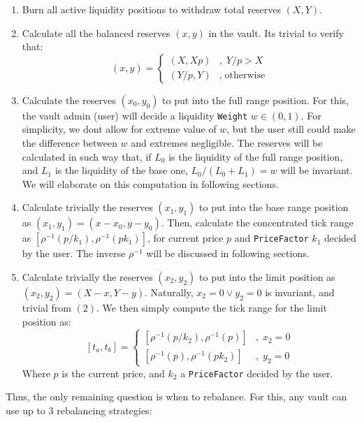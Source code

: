 \documentclass[11pt]{article}
\begin{document}
\begin{enumerate}
    \item Burn all active liquidity positions to withdraw total reserves $(X, Y)$.
    \item Calculate all the balanced reserves $(x, y)$ in the vault. Its trivial
        to verify that:
        $$
        (x, y) = \begin{cases}
            (X, Xp) &,\; Y/p > X\\
            (Y/p, Y) &,\; \text{otherwise}
        \end{cases}
        $$
    \item Calculate the reserves $(x_0, y_0)$ to put into the full range position.
        For this, the vault admin (user) will decide a liquidity
        \texttt{Weight} $w\in(0, 1)$. For simplicity, we dont allow for extreme
        value of $w$, but the user still could make the difference between $w$
        and extremes negligible. The reserves will be calculated in such way
        that, if $L_0$ is the liquidity of the full range position, and $L_1$
        is the liquidity of the base one, $L_0/(L_0 + L_1) = w$ will be
        invariant. We will elaborate on this computation in following sections.
    \item Calculate trivially the reserves $(x_1, y_1)$ to put into the base
        range position as $(x_1, y_1) = (x - x_0, y - y_0)$. Then, calculate
        the concentrated tick range as $[\rho^{-1}(p/k_1), \rho^{-1}(pk_1)]$, for
        current price $p$ and \texttt{PriceFactor} $k_1$ decided by the user.
        The inverse $\rho^{-1}$ will be discussed in following sections.
    \item Calculate trivially the reserves $(x_2, y_2)$ to put into the limit
        position as $(x_2, y_2) = (X - x, Y - y)$. Naturally, $x_2 = 0\lor y_2 = 0$
        is invariant, and trivial from $(2)$. We then simply compute the tick range
        for the limit position as:
        $$
        [t_a, t_b] = \begin{cases}
            [\rho^{-1}(p/k_2), \rho^{-1}(p)] &,\; x_2 = 0\\
            [\rho^{-1}(p), \rho^{-1}(pk_2)] &,\; y_2 = 0
        \end{cases}
        $$
        Where $p$ is the current price, and $k_2$ a \texttt{PriceFactor} decided by the user.
\end{enumerate}
Thus, the only remaining question is when to rebalance. For this, any vault can use up to
3 rebalancing strategies:
\end{document}

